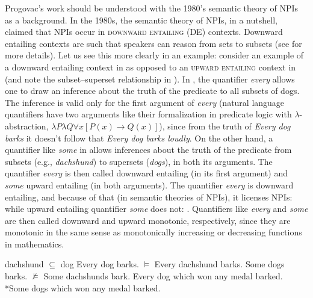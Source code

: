 \documentclass[output=paper,colorlinks,citecolor=brown]{langscibook}
\begin{document}
Progovac's work should be understood with the 1980's semantic theory of NPIs as a background. In the 1980s, the semantic theory of NPIs, in a nutshell, claimed that NPIs occur in \textsc{downward entailing} (DE) contexts. Downward entailing contexts are such that speakers can reason from sets to subsets (see  for more details). Let us see this more clearly in an example: consider an example of a downward entailing context in  as opposed to an \textsc{upward entailing} context in  (and note the subset--superset relationship in ). In , the quantifier \emph{every} allows one to draw an inference about the truth of the predicate to all subsets of dogs. The inference is valid only for the first argument of \textit{every} (natural language quantifiers have two arguments like their formalization in predicate logic with $\lambda$-abstraction, $\lambda P\lambda Q\forall x[P(x) \rightarrow Q(x)]$), since from the truth of \textit{Every dog barks} it doesn't follow that \textit{Every dog barks loudly}. On the other hand, a quantifier like \emph{some} in  allows inferences about the truth of the predicate from subsets (e.g., \emph{dachshund}) to supersets (\emph{dogs}), in both its arguments. The quantifier \emph{every} is then called downward entailing (in its first argument) and \emph{some} upward entailing (in both arguments). The quantifier \textit{every} is downward entailing, and because of that (in semantic theories of NPIs), it licenses NPIs:  while upward entailing quantifier \emph{some} does not: . Quantifiers like \textit{every} and \textit{some} are then called downward and upward monotonic, respectively, since they are monotonic in the same sense as monotonically increasing or decreasing functions in mathematics.  %

\newpage
\ea\ea\label{ex:5-a}dachshund $\subseteq$ dog
\ex\label{ex:5-b} Every dog barks. $\models$ Every dachshund barks.
\ex\label{ex:5-c} Some dogs barks. $\not\models$ Some dachshunds bark.
\ex\label{ex:5-d} Every dog which won any medal barked.
\ex\label{ex:5-e} *Some dogs which won any medal barked.
\z
\z
\end{document}

